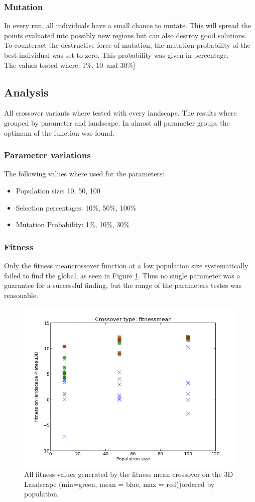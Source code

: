 \documentclass{scrartcl}
\begin{document}
\subsubsection{Mutation}
In every run, all individuals have a small chance to mutate. This will spread the points evaluated into possibly new regions but can also destroy good solutions. To counteract the destructive force of mutation, the mutation probability of the best individual was set to zero.
This probability was given in percentage.\\
The values tested where: 1\%, 10\ and 30\%]


\subsection{Analysis}
All crossover variants where tested with every landscape. The results where grouped by parameter and landscape. In almost all parameter groups the optimum of the function was found. 

\subsubsection{Parameter variations}
The following values where used for the parameters:
\begin{itemize}
\item Population size: 10, 50, 100
\item Selection percentages: 10\%, 50\%, 100\%
\item Mutation Probability: 1\%, 10\%, 30\%
 \end{itemize}

\subsubsection{Fitness}
Only the fitness meancrossover function at a low population size systematically failed to find the global, as seen in Figure \ref{fig:fitnessmeanpop}. Thus no single parameter was a guarantee for a successful finding, but the range of the parameters testes was reasonable.


\begin{figure}
 \center
 \includegraphics[width=.5\linewidth]{img/ex2/fitnessmean-Plateau3D-pop.png} 
 \caption{All fitness values generated by the fitness mean crossover on the 3D Landscape (min=green, mean = blue, max = red))ordered by population.}
 \label{fig:fitnessmeanpop}
\end{figure}
\end{document}
